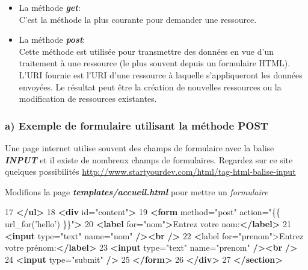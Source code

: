 \documentclass{article}
\newenvironment{Shaded}{}{}
\newcommand{\KeywordTok}[1]{\textcolor[rgb]{0.00,0.44,0.13}{\textbf{{#1}}}}
\newcommand{\StringTok}[1]{\textcolor[rgb]{0.25,0.44,0.63}{{#1}}}
\newcommand{\OtherTok}[1]{\textcolor[rgb]{0.00,0.44,0.13}{{#1}}}
\newcommand{\ErrorTok}[1]{\textcolor[rgb]{1.00,0.00,0.00}{\textbf{{#1}}}}
\newcommand{\NormalTok}[1]{{#1}}
\begin{document}
\begin{itemize}
\itemsep1pt\parskip0pt
\item
  La méthode \textbf{\emph{get}}:\\C'est la méthode la plus courante
  pour demander une ressource.
\item
  La méthode \textbf{\emph{post}}:\\Cette méthode est utilisée pour
  transmettre des données en vue d'un traitement à une ressource (le
  plus souvent depuis un formulaire HTML). L'URI fournie est l'URI d'une
  ressource à laquelle s'appliqueront les données envoyées. Le résultat
  peut être la création de nouvelles ressources ou la modification de
  ressources existantes.
\end{itemize}

\subsubsection{a) Exemple de formulaire utilisant la méthode
POST}\label{a-exemple-de-formulaire-utilisant-la-muxe9thode-post}

Une page internet utilise souvent des champs de formulaire avec la
balise \textbf{\emph{INPUT}} et il existe de nombreux champs de
formulaires. Regardez sur ce site quelques possibilités
\url{http://www.startyourdev.com/html/tag-html-balise-input}

Modifions la page \textbf{\emph{templates/accueil.html}} pour mettre un
\emph{formulaire}

\begin{Shaded}
\begin{Highlighting}[]
\NormalTok{17  }\KeywordTok{</ul>}
\NormalTok{18  }\KeywordTok{<div}\OtherTok{ id=}\StringTok{"content"}\KeywordTok{>}
\NormalTok{19     }\KeywordTok{<form}\OtherTok{ method=}\StringTok{"post"}\OtherTok{ action=}\StringTok{"\{\{ url_for('hello') \}\}"}\KeywordTok{>}
\NormalTok{20     }\KeywordTok{<label}\OtherTok{ for=}\StringTok{"nom"}\KeywordTok{>}\NormalTok{Entrez votre nom:}\KeywordTok{</label>}
\NormalTok{21     }\KeywordTok{<input}\OtherTok{ type=}\StringTok{"text"}\OtherTok{ name=}\StringTok{"nom"} \KeywordTok{/><br} \KeywordTok{/>}
\NormalTok{22     }\ErrorTok{<}\NormalTok{label for="prenom">Entrez votre prénom:}\KeywordTok{</label>}
\NormalTok{23     }\KeywordTok{<input}\OtherTok{ type=}\StringTok{"text"}\OtherTok{ name=}\StringTok{"prenom"} \KeywordTok{/><br} \KeywordTok{/>}
\NormalTok{24     }\KeywordTok{<input}\OtherTok{ type=}\StringTok{"submit"} \KeywordTok{/>}
\NormalTok{25     }\KeywordTok{</form>}
\NormalTok{26 }\KeywordTok{</div>}
\NormalTok{27 }\KeywordTok{</section>}
\end{Highlighting}
\end{Shaded}
\end{document}
